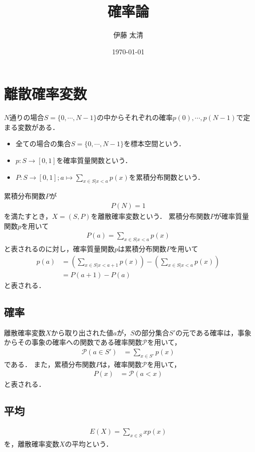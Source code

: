 \documentclass[dvipdfmx]{jsarticle}
\title{確率論}
\author{伊藤 太清}
\date{\today}
\begin{document}
 \maketitle
 \section{離散確率変数}
$N$通りの場合$S=\{0,\cdots,N-1\}$の中からそれぞれの確率$p\left(0\right),\cdots,p\left(N-1\right)$で定まる変数がある．
 \begin{itemize}
  \item 全ての場合の集合$S=\{0,\cdots,N-1\}$を標本空間という．
  \item $p:S\to\left[0,1\right]$を確率質量関数という．
  \item $P:S\to\left[0,1\right];a\mapsto\sum_{x\in S|x<a}p\left(x\right)$を累積分布関数という．
 \end{itemize}
累積分布関数$P$が
 \begin{align}
  P\left(N\right)=1
 \end{align}
を満たすとき，$X=\left(S,P\right)$を離散確率変数という．
累積分布関数$P$が確率質量関数$p$を用いて
 \begin{align}
  P\left(a\right)=\sum_{x\in S|x<a}p\left(x\right)
 \end{align}
と表されるのに対し，確率質量関数$p$は累積分布関数$P$を用いて
 \begin{align}
  p\left(a\right)&=\left(\sum_{x\in S|x<a+1}p\left(x\right)\right)-\left(\sum_{x\in S|x<a}p\left(x\right)\right)\nonumber\\
  &=P\left(a+1\right)-P\left(a\right)
 \end{align}
と表される．
 \subsection{確率}
離散確率変数$X$から取り出された値$a$が，$S$の部分集合$S'$の元である確率は，事象からその事象の確率への関数である確率関数$\mathscr{P}$を用いて，
 \begin{align}
  \mathscr{P}\left(a\in S'\right)&=\sum_{x\in S'}p\left(x\right)
 \end{align}
である．
また，累積分布関数$P$は，確率関数$\mathscr{P}$を用いて，
 \begin{align}
  P\left(x\right)&=\mathscr{P}\left(a<x\right)
 \end{align}
と表される．
 \subsection{平均}
 \begin{align}
  E\left(X\right)=\sum_{x\in S}xp\left(x\right)
 \end{align}
を，離散確率変数$X$の平均という．
\end{document}
